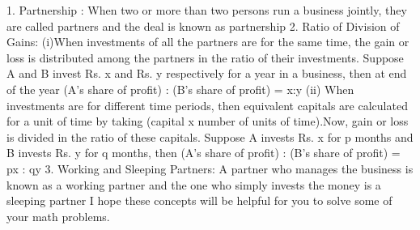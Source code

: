 \documentclass[12pt]{article}
\begin{document}
1. Partnership : When two or more than two persons run a business jointly, they are called partners and the deal is known  as partnership
2. Ratio of Division of Gains:
(i)When investments of all the partners are for the same time, the gain or loss is distributed among the partners in the ratio of their investments.
Suppose A and B invest Rs. x and Rs. y respectively for a year in a business, then at end of the year
(A's share of profit) : (B's share of profit) = x:y
(ii) When investments are for different time periods, then equivalent capitals are calculated for a unit of time by taking (capital x number of units of time).Now, gain or loss is divided in the ratio of these capitals.
Suppose A invests Rs. x for p months and B invests Rs. y for q months, then  
(A's share of profit) : (B's share of profit) = px : qy
3. Working and Sleeping Partners:
A partner who manages the business is known as a working partner and the one who simply invests the money is a sleeping partner
I hope these concepts will be helpful for you to solve some of your math problems.
\end{document}

